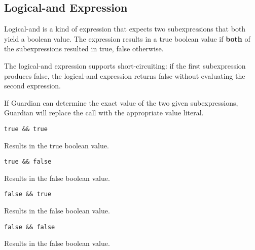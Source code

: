 
\subsection{Logical-and Expression}
{
	Logical-and is a kind of expression that expects two subexpressions that
	both yield a boolean value. The expression results in a true boolean value
	if \textbf{both} of the subexpressions resulted in true, false otherwise.
	
	The logical-and expression supports short-circuiting: if the first
	subexpression produces false, the logical-and expression returns false
	without evaluating the second expression.
	
	If Guardian can determine the exact value of the two given subexpressions,
	Guardian will replace the call with the appropriate value literal.
	
	\begin{itemize}
	{
		\item[] \lstinline[language=MAIA, columns=fixed]@true && true@
		
			Results in the true boolean value.
			
		\item[] \lstinline[language=MAIA, columns=fixed]@true && false@
		
			Results in the false boolean value.
			
		\item[] \lstinline[language=MAIA, columns=fixed]@false && true@
		
			Results in the false boolean value.
			
		\item[] \lstinline[language=MAIA, columns=fixed]@false && false@
		
			Results in the false boolean value.
	}
	\end{itemize}
}
